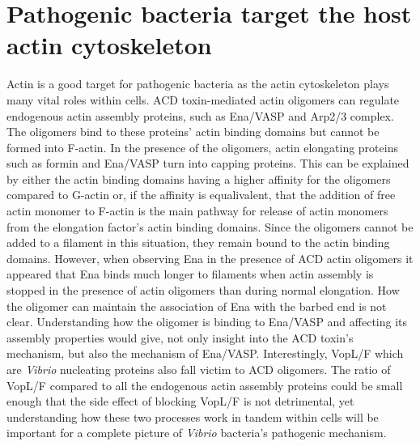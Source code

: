 \section{Pathogenic bacteria target the host actin cytoskeleton}\label{bacteria-conclusions}
Actin is a good target for pathogenic bacteria as the actin cytoskeleton plays many vital roles within cells. ACD toxin-mediated actin oligomers can regulate endogenous actin assembly proteins, such as Ena/VASP and Arp2/3 complex. The oligomers bind to these proteins' actin binding domains but cannot be formed into F-actin. In the presence of the oligomers, actin elongating proteins such as formin and Ena/VASP turn into capping proteins. This can be explained by either the actin binding domains having a higher affinity for the oligomers compared to G-actin or, if the affinity is equalivalent, that the addition of free actin monomer to F-actin is the main pathway for release of actin monomers from the elongation factor's actin binding domains. Since the oligomers cannot be added to a filament in this situation, they remain bound to the actin binding domains. However, when observing Ena in the presence of ACD actin oligomers it appeared that Ena binds much longer to filaments when actin assembly is stopped in the presence of actin oligomers than during normal elongation. How the oligomer can maintain the association of Ena with the barbed end is not clear. Understanding how the oligomer is binding to Ena/VASP and affecting its assembly properties would give, not only insight into the ACD toxin's mechanism, but also the mechanism of Ena/VASP. Interestingly, VopL/F which are \textit{Vibrio} nucleating proteins also fall victim to ACD oligomers. The ratio of VopL/F compared to all the endogenous actin assembly proteins could be small enough that the side effect of blocking VopL/F is not detrimental, yet understanding how these two processes work in tandem within cells will be important for a complete picture of \textit{Vibrio} bacteria's pathogenic mechanism. 

